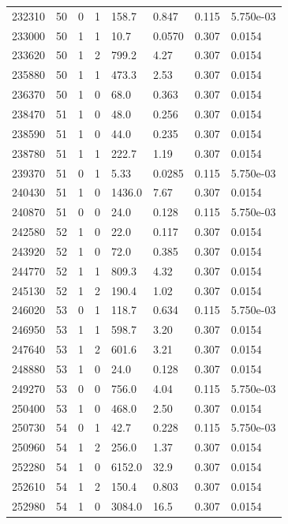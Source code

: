 \documentclass[preview]{standalone}
\begin{document}
{{{{{{{\begin{tabular}{L{1.2cm}C{1.2cm} C{0.3cm}C{0.5cm} C{1.4cm}C{1.4cm} C{1.4cm}C{1.4cm}}
  232310  &    50  & 0     &  1 &  158.7  & 0.847  & 0.115 &  5.750e-03   \\ 
  233000  &    50  & 1     &  1 &  10.7  & 0.0570  & 0.307 &  0.0154   \\ 
  233620  &    50  & 1     &  2 &  799.2  & 4.27  & 0.307 &  0.0154   \\ 
  235880  &    50  & 1     &  1 &  473.3  & 2.53  & 0.307 &  0.0154   \\ 
  236370  &    50  & 1     &  0 &  68.0  & 0.363  & 0.307 &  0.0154   \\ 
  238470  &    51  & 1     &  0 &  48.0  & 0.256  & 0.307 &  0.0154   \\ 
  238590  &    51  & 1     &  0 &  44.0  & 0.235  & 0.307 &  0.0154   \\ 
  238780  &    51  & 1     &  1 &  222.7  & 1.19  & 0.307 &  0.0154   \\ 
  239370  &    51  & 0     &  1 &  5.33  & 0.0285  & 0.115 &  5.750e-03   \\ 
  240430  &    51  & 1     &  0 &  1436.0  & 7.67  & 0.307 &  0.0154   \\ 
  240870  &    51  & 0     &  0 &  24.0  & 0.128  & 0.115 &  5.750e-03   \\ 
  242580  &    52  & 1     &  0 &  22.0  & 0.117  & 0.307 &  0.0154   \\ 
  243920  &    52  & 1     &  0 &  72.0  & 0.385  & 0.307 &  0.0154   \\ 
  244770  &    52  & 1     &  1 &  809.3  & 4.32  & 0.307 &  0.0154   \\ 
  245130  &    52  & 1     &  2 &  190.4  & 1.02  & 0.307 &  0.0154   \\ 
  246020  &    53  & 0     &  1 &  118.7  & 0.634  & 0.115 &  5.750e-03   \\ 
  246950  &    53  & 1     &  1 &  598.7  & 3.20  & 0.307 &  0.0154   \\ 
  247640  &    53  & 1     &  2 &  601.6  & 3.21  & 0.307 &  0.0154   \\ 
  248880  &    53  & 1     &  0 &  24.0  & 0.128  & 0.307 &  0.0154   \\ 
  249270  &    53  & 0     &  0 &  756.0  & 4.04  & 0.115 &  5.750e-03   \\ 
  250400  &    53  & 1     &  0 &  468.0  & 2.50  & 0.307 &  0.0154   \\ 
  250730  &    54  & 0     &  1 &  42.7  & 0.228  & 0.115 &  5.750e-03   \\ 
  250960  &    54  & 1     &  2 &  256.0  & 1.37  & 0.307 &  0.0154   \\ 
  252280  &    54  & 1     &  0 &  6152.0  & 32.9  & 0.307 &  0.0154   \\ 
  252610  &    54  & 1     &  2 &  150.4  & 0.803  & 0.307 &  0.0154   \\ 
  252980  &    54  & 1     &  0 &  3084.0  & 16.5  & 0.307 &  0.0154   \\ 
\hline 
\end{tabular} 

}}}}}}}
\end{document}
